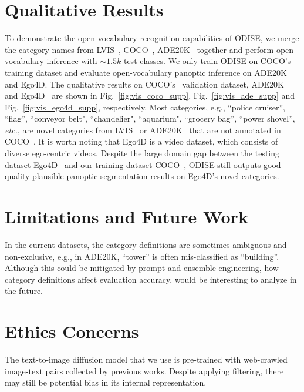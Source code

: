 \documentclass[10pt,twocolumn,letterpaper]{article}
\newcommand{\ourmethod}{ODISE}
\begin{document}
\section{Qualitative Results}

To demonstrate the open-vocabulary recognition capabilities of \ourmethod{}, we merge the category names from LVIS~\cite{gupta2019lvis}, COCO~\cite{lin2014coco}, ADE20K~\cite{zhou2019ade} together and perform open-vocabulary inference with ${\sim} 1.5k$ test classes.
We only train \ourmethod{} on COCO's~\cite{lin2014coco} training dataset and evaluate open-vocabulary panoptic inference on ADE20K~\cite{zhou2019ade} and Ego4D\cite{grauman2022ego4d}.
The qualitative results on COCO's~\cite{lin2014coco} validation dataset, ADE20K~\cite{zhou2019ade} and Ego4D~\cite{grauman2022ego4d} are shown in Fig.~\ref{fig:vis_coco_supp}, Fig.~\ref{fig:vis_ade_supp} and Fig.~\ref{fig:vis_ego4d_supp}, respectively. 
Most categories, e.g., ``police cruiser'', ``flag'', ``conveyor belt", ``chandelier", ``aquarium", ``grocery bag'', ``power shovel'', \textit{etc.}, are novel categories from LVIS~\cite{gupta2019lvis} or ADE20K~\cite{zhou2019ade} that are not annotated in COCO~\cite{lin2014coco}. 
It is worth noting that Ego4D\cite{grauman2022ego4d} is a video dataset, which consists of diverse ego-centric videos. 
Despite the large domain gap between the testing dataset Ego4D~\cite{grauman2022ego4d} and our training dataset COCO~\cite{lin2014coco}, \ourmethod{} still outputs good-quality plausible panoptic segmentation results on Ego4D's novel categories.

\section{Limitations and Future Work}
In the current datasets, the category definitions are sometimes ambiguous and non-exclusive, e.g., in ADE20K, ``tower'' is often mis-classified as ``building''.
Although this could be mitigated by prompt and ensemble engineering, how category definitions affect evaluation accuracy, would be interesting to analyze in the future.

\section{Ethics Concerns}
The text-to-image diffusion model that we use is pre-trained with web-crawled image-text pairs collected by previous works. Despite applying filtering, there may still be potential bias in its internal representation.
\end{document}
